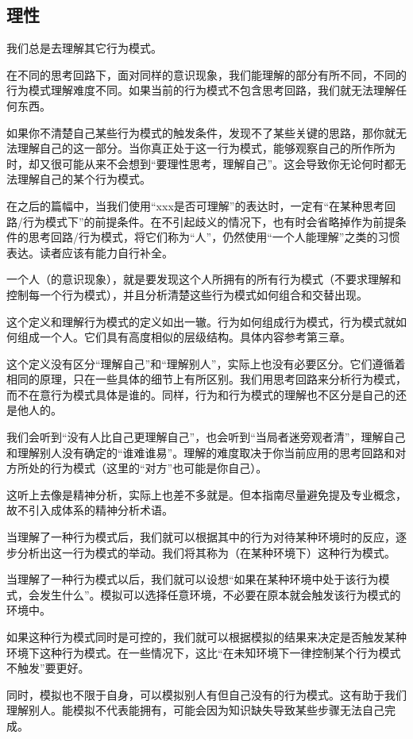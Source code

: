 \subsection{理性}
\noindent 我们总是去理解其它行为模式。
\begin{explain}
在不同的思考回路下，面对同样的意识现象，我们能理解的部分有所不同，不同的行为模式理解难度不同。如果当前的行为模式不包含思考回路，我们就无法理解任何东西。

如果你不清楚自己某些行为模式的触发条件，发现不了某些关键的思路，那你就无法理解自己的这一部分。当你真正处于这一行为模式，能够观察自己的所作所为时，却又很可能从来不会想到“要理性思考，理解自己”。这会导致你无论何时都无法理解自己的某个行为模式。

\label{para:不研究人}在之后的篇幅中，当我们使用“xxx是否可理解”的表达时，一定有“在某种思考回路/行为模式下”的前提条件。在不引起歧义的情况下，也有时会省略掉作为前提条件的思考回路/行为模式，将它们称为“人”，仍然使用“一个人能理解”之类的习惯表达。读者应该有能力自行补全。
\end{explain}
一个人（的意识现象），就是要发现这个人所拥有的所有行为模式（不要求理解和控制每一个行为模式），并且分析清楚这些行为模式如何组合和交替出现。
\begin{explain}
这个定义和理解行为模式的定义如出一辙。行为如何组成行为模式，行为模式就如何组成一个人。它们具有高度相似的层级结构。具体内容参考第三章。

这个定义没有区分“理解自己”和“理解别人”，实际上也没有必要区分。它们遵循着相同的原理，只在一些具体的细节上有所区别。我们用思考回路来分析行为模式，而不在意行为模式具体是谁的。同样，行为和行为模式的理解也不区分是自己的还是他人的。

我们会听到“没有人比自己更理解自己”，也会听到“当局者迷旁观者清”，理解自己和理解别人没有确定的“谁难谁易”。理解的难度取决于你当前应用的思考回路和对方所处的行为模式（这里的“对方”也可能是你自己）。

这听上去像是精神分析，实际上也差不多就是。但本指南尽量避免提及专业概念，故不引入成体系的精神分析术语。
\end{explain}
当理解了一种行为模式后，我们就可以根据其中的行为对待某种环境时的反应，逐步分析出这一行为模式的举动。我们将其称为（在某种环境下）这种行为模式。
\begin{explain}
当理解了一种行为模式以后，我们就可以设想“如果在某种环境中处于该行为模式，会发生什么”。模拟可以选择任意环境，不必要在原本就会触发该行为模式的环境中。

如果这种行为模式同时是可控的，我们就可以根据模拟的结果来决定是否触发某种环境下这种行为模式。在一些情况下，这比“在未知环境下一律控制某个行为模式不触发”要更好。

同时，模拟也不限于自身，可以模拟别人有但自己没有的行为模式。这有助于我们理解别人。能模拟不代表能拥有，可能会因为知识缺失导致某些步骤无法自己完成。
\end{explain}
